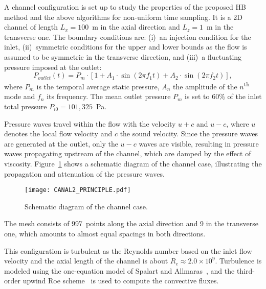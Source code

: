 
A channel configuration is set up to study the properties of the
proposed HB method and the above algorithms for non-uniform time
sampling.  It is a 2D channel of length $L_x = 100$~m in the axial
direction and $L_z = 1$~m in the transverse one.  The boundary
conditions are: (i)~an injection condition for the inlet,
(ii)~symmetric conditions for the upper and lower bounds as the flow
is assumed to be symmetric in the transverse direction, and (iii)~a
fluctuating pressure imposed at the outlet:
\begin{equation}
  P_{outlet}(t) = P_m \cdot \left[1 + A_1 \cdot \sin(2 \pi f_1 t) +
    A_2 \cdot \sin(2 \pi f_2 t) \right],
  \label{eq:outlet_canal}
\end{equation}
where $P_m$ is the temporal average static pressure, $A_n$ the
amplitude of the $n$\textsuperscript{th} mode and $f_n$ its
frequency. The mean outlet pressure $P_m$ is set to $60\%$ of the
inlet total pressure $P_{i0} = 101,325$~Pa.

Pressure waves travel within the flow with the velocity $u + c$ and $u
- c$, where $u$ denotes the local flow velocity and $c$ the sound
velocity. Since the pressure waves are generated at the outlet, only
the $u-c$ waves are visible, resulting in pressure waves propagating
upstream of the channel, which are damped by the effect of
viscosity. Figure~\ref{fig:canal_principle} shows a schematic diagram
of the channel case, illustrating the propagation and attenuation of
the pressure waves.
\begin{figure}[htb]
  \centering
  \texttt{[image: CANAL2\_PRINCIPLE.pdf]}
  \caption{Schematic diagram of the channel case.}
  \label{fig:canal_principle}
\end{figure}

The mesh consists of 997~points along the axial direction and 9 in the
transverse one, which amounts to almost equal spacings in both
directions.

This configuration is turbulent as the Reynolds number based on the
inlet flow velocity and the axial length of the channel is about $R_e
\approx 2.0 \times 10^9$.  Turbulence is modeled using the
one-equation model of Spalart and Allmaras~\cite{Spalart1992}, and the
third-order upwind Roe scheme~\cite{Roe1981} is used to compute the
convective fluxes.
